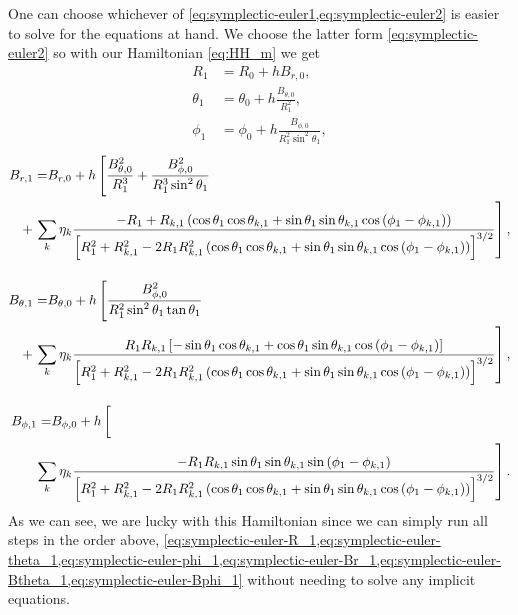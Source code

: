 One can choose whichever of \cref{eq:symplectic-euler1,eq:symplectic-euler2} is easier to solve for the equations at hand. We choose the latter form \cref{eq:symplectic-euler2} so with our Hamiltonian \cref{eq:HH_m} we get
\begin{align}
    R_1 &= R_0 + h B_{r,0} \label{eq:symplectic-euler-R_1}, \\[0.4cm]
    \theta_1 &= \theta_0 + h \frac{B_{\theta,0}}{R_1^2}, \label{eq:symplectic-euler-theta_1} \\[0.4cm]
    \phi_1 &= \phi_0 + h \frac{B_{\phi,0}}{R_1^2 \sin^2{\theta_1}}, \label{eq:symplectic-euler-phi_1}
\end{align}
\begin{align}    
    \begin{aligned}
        B_{r,1} = & B_{r,0} + h \left[ \frac{B_{\theta,0}^2}{R_1^3} + \frac{B_{\phi,0}^2}{R_1^3 \sin^2{\theta_1}} \right. \\
        & \hspace{-21.0pt} + \left. \sum\limits_{k} \eta_k \frac{-R_1 + R_{k,1} \left(\cos{\theta_1}\cos{\theta_{k,1}} + \sin{\theta_1}\sin{\theta_{k,1}}\cos{(\phi_1 - \phi_{k,1})}\right)}{\left[R_1^2 + R_{k,1}^2 -2 R_1 R_{k,1}^2 \left(\cos{\theta_1}\cos{\theta_{k,1}} + \sin{\theta_1}\sin{\theta_{k,1}}\cos{(\phi_1 - \phi_{k,1})} \right) \right]^{3/2}} \right] , \label{eq:symplectic-euler-Br_1}
    \end{aligned} \\[0.4cm]
    \begin{aligned}
        B_{\theta,1} = & B_{\theta,0} + h \left[ \frac{B_{\phi,0}^2}{R_1^2 \sin^2{\theta_1} \tan{\theta_1}} \right. \\
        & \hspace{-21.0pt} + \left. \sum\limits_{k} \eta_k \frac{R_1 R_{k,1} \left[-\sin{\theta_1}\cos{\theta_{k,1}} + \cos{\theta_1}\sin{\theta_{k,1}}\cos{(\phi_1 - \phi_{k,1})} \right]}{\left[R_1^2 + R_{k,1}^2 -2 R_1 R_{k,1}^2 \left(\cos{\theta_1}\cos{\theta_{k,1}} + \sin{\theta_1}\sin{\theta_{k,1}}\cos{(\phi_1 - \phi_{k,1})} \right) \right]^{3/2}} \right], \label{eq:symplectic-euler-Btheta_1}
    \end{aligned} \\[0.4cm]
    \begin{aligned}
        B_{\phi,1} = & B_{\phi,0} + h \left[ \vphantom{\frac12} \right.\\
        & \hspace{-21.0pt} \hphantom{+} \left. \sum\limits_{k} \eta_k \frac{- R_1 R_{k,1} \sin{\theta_1}\sin{\theta_{k,1}}\sin{(\phi_1 - \phi_{k,1})}}{\left[R_1^2 + R_{k,1}^2 -2 R_1 R_{k,1}^2 \left(\cos{\theta_1}\cos{\theta_{k,1}} + \sin{\theta_1}\sin{\theta_{k,1}}\cos{(\phi_1 - \phi_{k,1})} \right) \right]^{3/2}} \right]. \label{eq:symplectic-euler-Bphi_1}
    \end{aligned}
\end{align}
As we can see, we are lucky with this Hamiltonian since we can simply run all steps in the order above, \cref{eq:symplectic-euler-R_1,eq:symplectic-euler-theta_1,eq:symplectic-euler-phi_1,eq:symplectic-euler-Br_1,eq:symplectic-euler-Btheta_1,eq:symplectic-euler-Bphi_1} without needing to solve any implicit equations.

